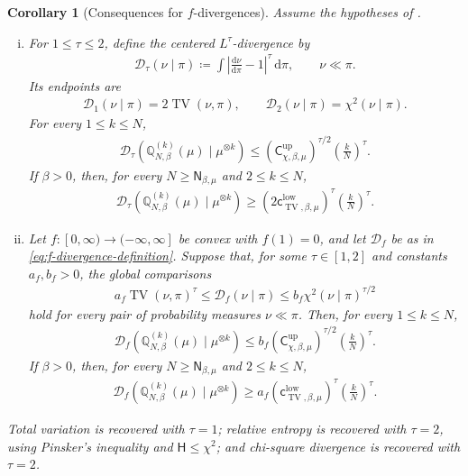 \documentclass[11pt,reqno]{amsart}
\numberwithin{equation}{section}
\theoremstyle{plain}
\newtheorem{cor}[cor]{Corollary}
\theoremstyle{remark}
\newcommand{\md}{\mathrm{d}}
\newcommand{\Q}{{\mathbb{Q}}}
\newcommand{\Hr}{{\mathsf{H}}}
\newcommand{\be}{\beta}
\newcommand{\Chi}{\chi^2}
\newcommand{\TV}{\operatorname{TV}}
\begin{document}
\begin{cor}[Consequences for \(f\)-divergences]\label{cor:f-divergence-consequences}
Assume the hypotheses of .
\begin{enumerate}[(i)]
\item For \(1\le\tau\le2\), define the centered \(L^\tau\)-divergence by
\begin{align}\label{eq:centered-Ltau-divergence}
 \mathscr D_\tau(\nu\mid\pi)
 \coloneqq
 \int\left|\frac{\md\nu}{\md\pi}-1\right|^\tau\,\md\pi,
 \qquad \nu\ll\pi.
\end{align}
Its endpoints are
\begin{align}\label{eq:centered-Ltau-endpoints}
 \mathscr D_1(\nu\mid\pi)=2\TV(\nu,\pi),
 \qquad
 \mathscr D_2(\nu\mid\pi)=\Chi(\nu\mid\pi).
\end{align}
For every \(1\le k\le N\),
\begin{align}\label{eq:centered-Ltau-upper}
 \mathscr D_\tau\!\left(\Q_{N,\be}^{(k)}(\mu)\mid\mu^{\otimes k}\right)
 \le
 \left(\mathsf C_{\chi,\be,\mu}^{\mathrm{up}}\right)^{\tau/2}
 \left(\frac{k}{N}\right)^\tau.
\end{align}
If \(\be>0\), then, for every \(N\ge\mathsf N_{\be,\mu}\) and \(2\le k\le N\),
\begin{align}\label{eq:centered-Ltau-lower}
 \mathscr D_\tau\!\left(\Q_{N,\be}^{(k)}(\mu)\mid\mu^{\otimes k}\right)
 \ge
 \left(2\mathsf c_{\TV,\be,\mu}^{\mathrm{low}}\right)^\tau
 \left(\frac{k}{N}\right)^\tau.
\end{align}

\item Let \(f:[0,\infty)\to(-\infty,\infty]\) be convex with \(f(1)=0\), and let \(\mathscr D_f\) be as in \eqref{eq:f-divergence-definition}.  Suppose that, for some \(\tau\in[1,2]\) and constants \(a_f,b_f>0\), the global comparisons
\begin{align}\label{eq:global-f-divergence-comparisons}
 a_f\TV(\nu,\pi)^\tau
 \le \mathscr D_f(\nu\mid\pi)
 \le b_f\Chi(\nu\mid\pi)^{\tau/2}
\end{align}
hold for every pair of probability measures \(\nu\ll\pi\).  Then, for every \(1\le k\le N\),
\begin{align}\label{eq:comparable-f-divergence-upper}
 \mathscr D_f\!\left(\Q_{N,\be}^{(k)}(\mu)\mid\mu^{\otimes k}\right)
 \le
 b_f\left(\mathsf C_{\chi,\be,\mu}^{\mathrm{up}}\right)^{\tau/2}
 \left(\frac{k}{N}\right)^\tau.
\end{align}
If \(\be>0\), then, for every \(N\ge\mathsf N_{\be,\mu}\) and \(2\le k\le N\),
\begin{align}\label{eq:comparable-f-divergence-lower}
 \mathscr D_f\!\left(\Q_{N,\be}^{(k)}(\mu)\mid\mu^{\otimes k}\right)
 \ge
 a_f\left(\mathsf c_{\TV,\be,\mu}^{\mathrm{low}}\right)^\tau
 \left(\frac{k}{N}\right)^\tau.
\end{align}
\end{enumerate}
Total variation is recovered with \(\tau=1\); relative entropy is recovered with \(\tau=2\), using Pinsker's inequality and \(\Hr\le\Chi\); and chi-square divergence is recovered with \(\tau=2\).
\end{cor}
\end{document}
